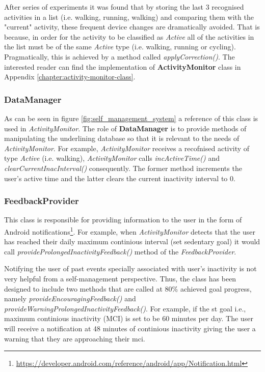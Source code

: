     After series of experiments it was found that by storing the last 3 recognised activities in a list (i.e. walking, running, walking) and comparing them with the "current" activity, these frequent device changes are dramatically avoided. That is because, in order for the activity to be classified as \textit{Active} all of the activities in the list must be of the same \textit{Active} type (i.e. walking, running or cycling). Pragmatically, this is achieved by a method called \textit{applyCorrection()}. The interested reader can find the implementation of \textbf{ActivityMonitor} class in Appendix \ref{chapter:activity-monitor-class}.
    
    \subsubsection{DataManager}
    As can be seen in figure \ref{fig:self_management_system} a reference of this class is used in \textit{ActivityMonitor}. The role of \textbf{DataManager} is to provide methods of manipulating the underlining database so that it is relevant to the needs of \textit{ActivityMonitor}. For example, \textit{ActivityMonitor} receives a recofnised activity of type \textit{Active} (i.e. walking), \textit{ActivityMonitor} calls \textit{incActiveTime()} and \textit{clearCurrentInacInterval()} consequently. The former method increments the user's active time and the latter clears the current inactivity interval to 0.
    
    \subsubsection{FeedbackProvider}
    This class is responsible for providing information to the user in the form of Android notifications\footnote{\url{https://developer.android.com/reference/android/app/Notification.html}}. For example, when \textit{ActivityMonitor} detects that the user has reached their daily maximum continious interval (set sedentary goal) it would call \textit{provideProlongedInactivityFeedback()} method of the \textit{FeedbackProvider}.
    
    Notifying the user of past events specially associated with user's inactivity is not very helpful from a self-management perspective. Thus, the class has been designed to include two methods that are called at 80\% achieved goal progress, namely \textit{provideEncouragingFeedback()} and \textit{provideWarningProlongedInactivityFeedback()}. For example, if the \gls{st} goal i.e., maximum continious inactivity (MCI) is set to be 60 minutes per day. The user will receive a notification at 48 minutes of continious inactivity giving the user a warning that they are approaching their \gls{mci}. 

